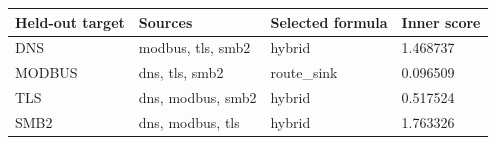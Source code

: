 \begin{tabular}{llll}
\hline
Held-out target & Sources & Selected formula & Inner score \\
\hline
DNS & modbus, tls, smb2 & hybrid & 1.468737 \\
MODBUS & dns, tls, smb2 & route\_sink & 0.096509 \\
TLS & dns, modbus, smb2 & hybrid & 0.517524 \\
SMB2 & dns, modbus, tls & hybrid & 1.763326 \\
\hline
\end{tabular}
